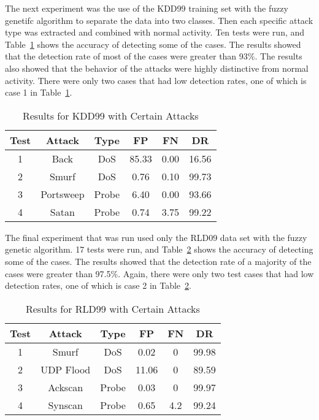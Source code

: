 \documentclass{sig-alternate}
\begin{document}
The next experiment was the use of the KDD99 training set with the fuzzy genetifc algorithm to separate the data into two classes. Then each specific attack type was extracted and combined with normal activity. Ten tests were run, and Table~\ref{tab:kddAttacks} shows the accuracy of detecting some of the cases. The results showed that the detection rate of most of the cases were greater than 93\%. The results also showed that the behavior of the attacks were highly distinctive from normal activity. There were only two cases that had low detection rates, one of which is case 1 in Table~\ref{tab:kddAttacks}.

\begin{table}
\caption{Results for KDD99 with Certain Attacks}
\begin{tabular}{|cccccc|} \hline
Test & Attack & Type & FP & FN & DR\\ \hline
1 & Back & DoS & 85.33 & 0.00 & 16.56\\
2 & Smurf & DoS & 0.76 & 0.10 & 99.73\\
3 & Portsweep & Probe & 6.40 & 0.00 & 93.66\\
4 & Satan & Probe & 0.74 & 3.75 & 99.22\\
\hline\end{tabular}
\label{tab:kddAttacks}
\end{table}

The final experiment that was run used only the RLD09 data set with the fuzzy genetic algorithm. 17 tests were run, and Table~\ref{tab:rldAttacks} shows the accuracy of detecting some of the cases. The results showed that the detection rate of a majority of the cases were greater than 97.5\%. Again, there were only two test cases that had low detection rates, one of which is case 2 in Table~\ref{tab:rldAttacks}.

\begin{table}
\caption{Results for RLD99 with Certain Attacks}
\begin{tabular}{|cccccc|} \hline
Test & Attack & Type & FP & FN & DR\\ \hline
1 & Smurf & DoS & 0.02 & 0 & 99.98\\
2 & UDP Flood & DoS & 11.06 & 0 & 89.59\\
3 & Ackscan & Probe & 0.03 & 0 & 99.97\\
4 & Synscan & Probe & 0.65 & 4.2 & 99.24\\
\hline\end{tabular}
\label{tab:rldAttacks}
\end{table}
\end{document}
